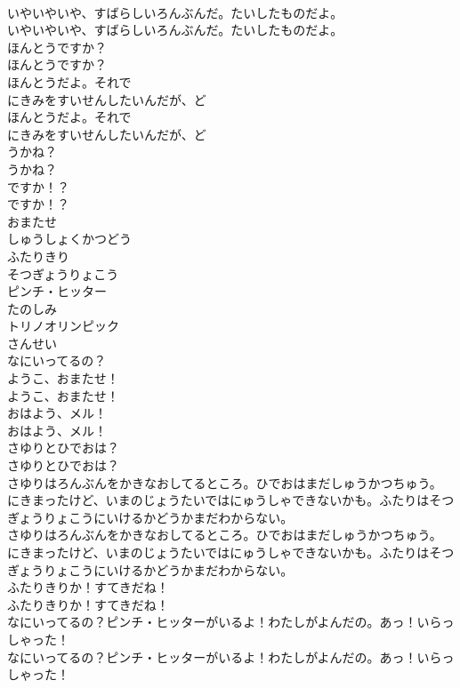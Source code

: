 \documentclass[8pt]{extreport}
\begin{document}
\begin{CJK}{UTF8}{min}
\\	いやいやいや、すばらしいろんぶんだ。たいしたものだよ。	
\\	いやいやいや、すばらしいろんぶんだ。たいしたものだよ。 
\\	ほんとうですか？	
\\	ほんとうですか？ 
\\	ほんとうだよ。それで
\\	にきみをすいせんしたいんだが、ど	
\\	ほんとうだよ。それで
\\	にきみをすいせんしたいんだが、ど 
\\	うかね？	
\\	うかね？ 
\\	ですか！？	
\\	ですか！？ 
\\	おまたせ
\\	しゅうしょくかつどう
\\	ふたりきり
\\	そつぎょうりょこう
\\	ピンチ・ヒッター
\\	たのしみ
\\	トリノオリンピック
\\	さんせい
\\	なにいってるの？
\\	ようこ、おまたせ！	
\\	ようこ、おまたせ！ 
\\	おはよう、メル！	
\\	おはよう、メル！ 
\\	さゆりとひでおは？	
\\	さゆりとひでおは？ 
\\	さゆりはろんぶんをかきなおしてるところ。ひでおはまだしゅうかつちゅう。
\\	にきまったけど、いまのじょうたいではにゅうしゃできないかも。ふたりはそつぎょうりょこうにいけるかどうかまだわからない。	
\\	さゆりはろんぶんをかきなおしてるところ。ひでおはまだしゅうかつちゅう。
\\	にきまったけど、いまのじょうたいではにゅうしゃできないかも。ふたりはそつぎょうりょこうにいけるかどうかまだわからない。 
\\	ふたりきりか！すてきだね！	
\\	ふたりきりか！すてきだね！ 
\\	なにいってるの？ピンチ・ヒッターがいるよ！わたしがよんだの。あっ！いらっしゃった！	
\\	なにいってるの？ピンチ・ヒッターがいるよ！わたしがよんだの。あっ！いらっしゃった！ 

\end{CJK}
\end{document}
